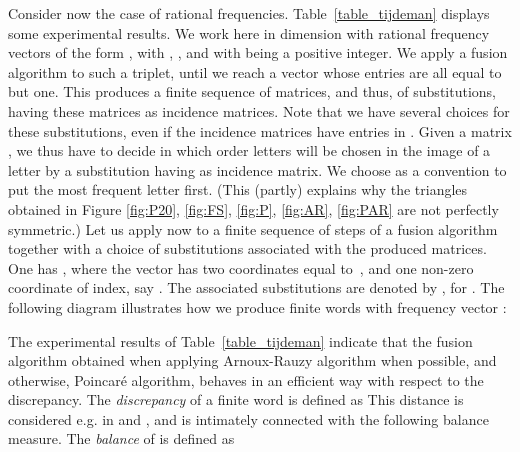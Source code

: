 \documentclass[preliminary,copyright,creativecommons]{eptcs}
\begin{document}
Consider now the case of  rational frequencies.  Table~\ref{table_tijdeman} displays  some experimental results.  We work here in dimension 
with  rational  frequency vectors of the form , with , , and with   being a positive integer.  
We apply  a  fusion algorithm  to  such a triplet, until we reach   a vector whose entries are all equal to  but one. This produces a  finite sequence of matrices, and thus, of   substitutions, having these  matrices  as  incidence matrices. Note that we have several choices for these substitutions, even  if 
the incidence matrices have  entries in .  Given a matrix , we  thus have to  decide in which order  letters will be   chosen in the image of a  letter by  a substitution  having 
 as incidence matrix. We choose  as a convention    to  put  the most frequent  letter first.  (This  (partly) explains why the triangles  obtained in Figure  \ref{fig:P20}, \ref{fig:FS},  \ref{fig:P}, \ref{fig:AR}, \ref{fig:PAR} are not  perfectly symmetric.)
Let us apply  now to  a finite  sequence of   steps  of a fusion algorithm 
together with a choice  of  substitutions associated with the produced matrices. One has
,
where  the vector   has  two coordinates equal to~, and  one non-zero coordinate of index, say 
. The associated   substitutions  are denoted by , for .  The following  diagram  illustrates how we produce
finite words  with frequency  vector  :




\begin{center}
\end{center}  

The experimental results  of Table~\ref{table_tijdeman} indicate that the     fusion algorithm obtained when applying Arnoux-Rauzy algorithm when possible, and  otherwise,       Poincar\'e algorithm, behaves in an efficient way  with respect to   the discrepancy. The  {\em discrepancy }    of  a  finite word   is defined  as 
   This distance is considered e.g.  in \cite{tij} and \cite{Adam},
 and is intimately connected with the following   balance measure.  The  {\em balance} of  is defined as 
 
\end{document}
